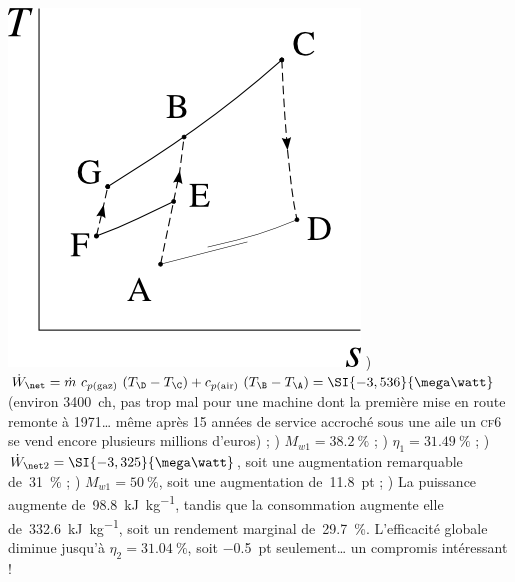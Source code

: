 \begin{description}
	 		\includegraphics[width=\solutiondiagramwidth]{images/exo_sol_ts_intercooler.png}
	 		) $\dot W_\net = \dot m \ c_{p \text{(gaz)}} \ (T_\D - T_\C) + c_{p \text{(air)}} \ (T_\B - T_\A) = \SI{-3,536}{\mega\watt}$ (environ \SI{3400}{ch}, pas trop mal pour une machine dont la première mise en route remonte à 1971… même après 15 années de service accroché sous une aile un \textsc{cf6} se vend encore plusieurs millions d’euros) ;
	 		) $M_{w1} = \SI{38,2}{\percent}$ ;
	 		) $\eta_1 = \SI{31,49}{\percent}$ ;
	 		) $\dot W_{\net 2} = \SI{-3,325}{\mega\watt}$, soit une augmentation remarquable de~\SI{31}{\percent} ;
	 		) $M_{w1} = \SI{50}{\percent}$, soit une augmentation de~\SI{+11,8}{pt} ;
	 		) La puissance augmente de~\SI{98,8}{\kilo\joule\per\kilogram}, tandis que la consommation augmente elle de~\SI{332,6}{\kilo\joule\per\kilogram}, soit un rendement marginal de~\SI{29,7}{\percent}. L’efficacité globale diminue jusqu’à $\eta_2 = \SI{31,04}{\percent}$, soit \SI{-0,5}{pt} seulement… un compromis intéressant !
	\end{description}


